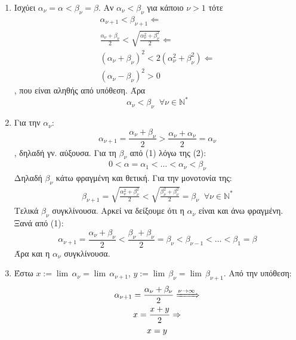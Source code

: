 \documentclass[a4paper]{article}
\numberwithin{equation}{section} %
\renewcommand{\a}{\alpha}
\renewcommand{\b}{\beta}
\newcommand{\n}{\nu}
\newcommand{\NN}{\mathbb{N}^{*}}
\begin{document}
\begin{enumerate}[label=\roman*)]
    \item Ισχύει $\alpha_\nu = \alpha < \beta_\nu = \beta$. Αν $\alpha_\nu < \beta_\nu$ για κάποιο $\nu > 1$ τότε
    \begin{gather*}
        \alpha_{\nu + 1} < \beta_{\nu + 1} \Leftarrow\\
        \frac{\alpha_\nu + \beta_\nu}{2} < \sqrt{\frac{\alpha_\nu^2 + \beta_\nu^2}{2}} \Leftarrow\\
        (\alpha_\nu + \beta_\nu)^2 < 2(\alpha_\nu^2 + \beta_\nu^2) \Leftarrow\\
        (\alpha_\nu - \beta_\nu)^2 > 0
    \end{gather*}
    , που είναι αληθής από υπόθεση. Άρα
    \begin{equation}
        \alpha_\nu < \beta_\nu \;\; \forall \nu \in \NN \tag{1}
    \end{equation}
    
    \item 
    Για την $\alpha_\nu$:
    \begin{equation*}
        \alpha_{\nu + 1} = \frac{\alpha_\nu + \beta_\nu}{2} > \frac{\alpha_\nu + \alpha_\nu}{2} = \alpha_\nu \tag{2}
    \end{equation*}
    , δηλαδή γν. αύξουσα. Για τη $\beta_\nu$ από (1) λόγω της (2):
    \begin{gather*}
    0 < \a = \a_{1}   < \ldots < \alpha_\nu < \beta_\nu
    \end{gather*}
    Δηλαδή $\beta_\nu$ κάτω φραγμένη και θετική. Για την μονοτονία της:
    \begin{gather*}
        \beta_{\nu+1} =\sqrt{\frac{\alpha_\nu^2 + \beta_\nu^2}{2}} < \sqrt{\frac{\beta_\nu^2 + \beta_\nu^2}{2}} = \beta_\nu \;\; \forall \nu \in \NN
    \end{gather*}
     Τελικά $\beta_\nu$ συγκλίνουσα. Αρκεί να δείξουμε ότι η $\a_\nu$ είναι και άνω φραγμένη. Ξανά από (1):
    \[
        \alpha_{\nu + 1} = \frac{\alpha_\nu + \beta_\nu}{2}  < \frac{\beta_\nu + \beta_\nu}{2} = \beta_\nu < \beta_{\nu - 1} < \ldots < \beta_1 = \beta
    \]
    Άρα και η $\a_\n$ συγκλίνουσα.
    
    \item 
    Έστω $x:=\lim\, \a_\n = \lim\, \a_{\n + 1}$, $y:=\lim\, \b_\n = \lim\, \b_{\n + 1}$. Από την υπόθεση:
    \begin{gather*}
         \alpha_{\nu + 1} = \frac{\alpha_\nu + \beta_\nu}{2} \xRightarrow[ \; ]{\nu \rightarrow \infty} \\
         x = \frac{x+y}{2} \Rightarrow \\
         x = y
    \end{gather*}

\end{enumerate}
\end{document}
